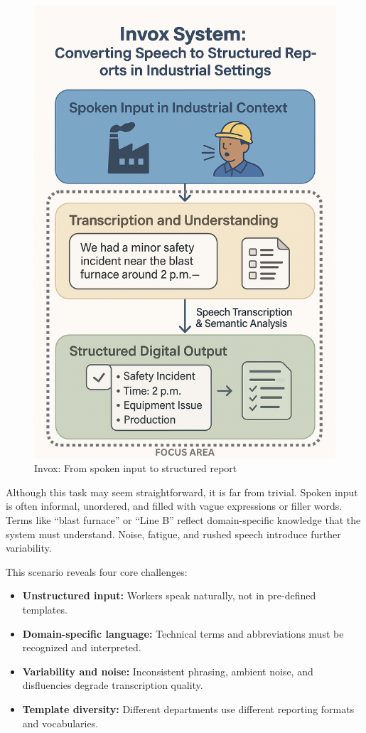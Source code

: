 \begin{figure}[ht]
    \centering
    \includegraphics[scale=0.35]{images/Motivation.png}
    \caption{Invox: From spoken input to structured report}
    \label{fig:invox-motivation}
\end{figure}

Although this task may seem straightforward, it is far from trivial. Spoken input is often informal, unordered, and filled with vague expressions or filler words. Terms like “blast furnace” or “Line B” reflect domain-specific knowledge that the system must understand. Noise, fatigue, and rushed speech introduce further variability.

This scenario reveals four core challenges:
\begin{itemize}
    \item \textbf{Unstructured input:} Workers speak naturally, not in pre-defined templates.
    \item \textbf{Domain-specific language:} Technical terms and abbreviations must be recognized and interpreted.
    \item \textbf{Variability and noise:} Inconsistent phrasing, ambient noise, and disfluencies degrade transcription quality.
    \item \textbf{Template diversity:} Different departments use different reporting formats and vocabularies.
\end{itemize}


